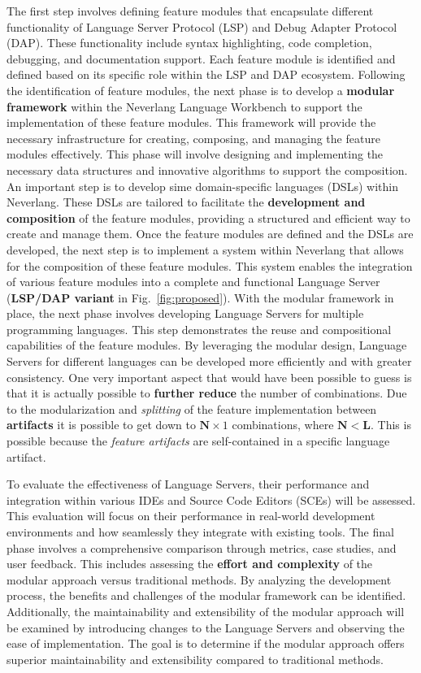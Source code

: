 The first step involves defining feature modules that encapsulate different functionality of Language Server Protocol (LSP) and Debug Adapter Protocol (DAP). These functionality include syntax highlighting, code completion, debugging, and documentation support. Each feature module is identified and defined based on its specific role within the LSP and DAP ecosystem. Following the identification of feature modules, the next phase is to develop a \textbf{modular framework} within the Neverlang Language Workbench to support the implementation of these feature modules. This framework will provide the necessary infrastructure for creating, composing, and managing the feature modules effectively. This phase will involve designing and implementing the necessary data structures and innovative algorithms to support the composition.
An important step is to develop sime domain-specific languages (DSLs) within Neverlang. These DSLs are tailored to facilitate the \textbf{development and composition} of the feature modules, providing a structured and efficient way to create and manage them. Once the feature modules are defined and the DSLs are developed, the next step is to implement a system within Neverlang that allows for the composition of these feature modules. This system enables the integration of various feature modules into a complete and functional Language Server (\textbf{LSP/DAP variant} in Fig.~\ref{fig:proposed}). With the modular framework in place, the next phase involves developing Language Servers for multiple programming languages. This step demonstrates the reuse and compositional capabilities of the feature modules. By leveraging the modular design, Language Servers for different languages can be developed more efficiently and with greater consistency.
One very important aspect that would have been possible to guess is that it is actually possible to \textbf{further reduce} the number of combinations. Due to the modularization and \textit{splitting} of the feature implementation between \textbf{artifacts} it is possible to get down to $\mathbf{N} \times 1$ combinations, where $\mathbf{N} < \mathbf{L}$. This is possible because the \textit{feature artifacts} are self-contained in a specific language artifact.


To evaluate the effectiveness of Language Servers, their performance and integration within various IDEs and Source Code Editors (SCEs) will be assessed. This evaluation will focus on their performance in real-world development environments and how seamlessly they integrate with existing tools. The final phase involves a comprehensive comparison through metrics, case studies, and user feedback. This includes assessing the \textbf{effort and complexity} of the modular approach versus traditional methods. By analyzing the development process, the benefits and challenges of the modular framework can be identified. Additionally, the maintainability and extensibility of the modular approach will be examined by introducing changes to the Language Servers and observing the ease of implementation. The goal is to determine if the modular approach offers superior maintainability and extensibility compared to traditional methods.

